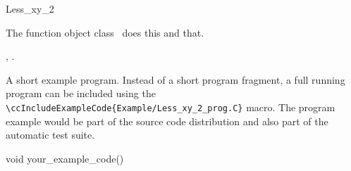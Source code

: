 

\begin{ccRefFunctionObjectClass}{Less_xy_2}  %


\ccDefinition
  
The function object class \ccRefName\ does this and that.


\ccIsModel


\ccTypes


\ccCreation
{}  %


\ccOperations


\ccSeeAlso

,
.

\ccExample

A short example program.
Instead of a short program fragment, a full running program can be
included using the 
\verb|\ccIncludeExampleCode{Example/Less_xy_2_prog.C}| 
macro. The program example would be part of the source code distribution and
also part of the automatic test suite.

\begin{ccExampleCode}
void your_example_code() {
}
\end{ccExampleCode}


\end{ccRefFunctionObjectClass}


